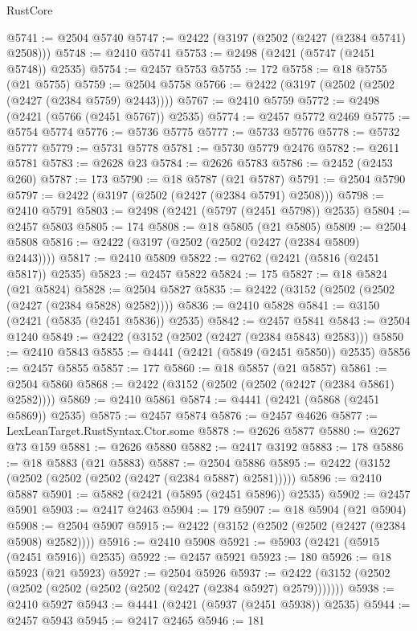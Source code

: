 \begin{lexlean}{RustCore}
\begin{coremodule}
@5741 := @2504 @5740
@5747 := @2422 (@3197 (@2502 (@2427 (@2384 @5741) @2508)))
@5748 := @2410 @5741
@5753 := @2498 (@2421 (@5747 (@2451 @5748)) @2535)
@5754 := @2457 @5753
@5755 := 172
@5758 := @18 @5755 (@21 @5755)
@5759 := @2504 @5758
@5766 := @2422 (@3197 (@2502 (@2502 (@2427 (@2384 @5759) @2443))))
@5767 := @2410 @5759
@5772 := @2498 (@2421 (@5766 (@2451 @5767)) @2535)
@5774 := @2457 @5772 @2469
@5775 := @5754 @5774
@5776 := @5736 @5775
@5777 := @5733 @5776
@5778 := @5732 @5777
@5779 := @5731 @5778
@5781 := @5730 @5779 @2476
@5782 := @2611 @5781
@5783 := @2628 @23
@5784 := @2626 @5783
@5786 := @2452 (@2453 @260)
@5787 := 173
@5790 := @18 @5787 (@21 @5787)
@5791 := @2504 @5790
@5797 := @2422 (@3197 (@2502 (@2427 (@2384 @5791) @2508)))
@5798 := @2410 @5791
@5803 := @2498 (@2421 (@5797 (@2451 @5798)) @2535)
@5804 := @2457 @5803
@5805 := 174
@5808 := @18 @5805 (@21 @5805)
@5809 := @2504 @5808
@5816 := @2422 (@3197 (@2502 (@2502 (@2427 (@2384 @5809) @2443))))
@5817 := @2410 @5809
@5822 := @2762 (@2421 (@5816 (@2451 @5817)) @2535)
@5823 := @2457 @5822
@5824 := 175
@5827 := @18 @5824 (@21 @5824)
@5828 := @2504 @5827
@5835 := @2422 (@3152 (@2502 (@2502 (@2427 (@2384 @5828) @2582))))
@5836 := @2410 @5828
@5841 := @3150 (@2421 (@5835 (@2451 @5836)) @2535)
@5842 := @2457 @5841
@5843 := @2504 @1240
@5849 := @2422 (@3152 (@2502 (@2427 (@2384 @5843) @2583)))
@5850 := @2410 @5843
@5855 := @4441 (@2421 (@5849 (@2451 @5850)) @2535)
@5856 := @2457 @5855
@5857 := 177
@5860 := @18 @5857 (@21 @5857)
@5861 := @2504 @5860
@5868 := @2422 (@3152 (@2502 (@2502 (@2427 (@2384 @5861) @2582))))
@5869 := @2410 @5861
@5874 := @4441 (@2421 (@5868 (@2451 @5869)) @2535)
@5875 := @2457 @5874
@5876 := @2457 @4626
@5877 := LexLeanTarget.RustSyntax.Ctor.some
@5878 := @2626 @5877
@5880 := @2627 @73 @159
@5881 := @2626 @5880
@5882 := @2417 @3192
@5883 := 178
@5886 := @18 @5883 (@21 @5883)
@5887 := @2504 @5886
@5895 := @2422 (@3152 (@2502 (@2502 (@2502 (@2427 (@2384 @5887) @2581)))))
@5896 := @2410 @5887
@5901 := @5882 (@2421 (@5895 (@2451 @5896)) @2535)
@5902 := @2457 @5901
@5903 := @2417 @2463
@5904 := 179
@5907 := @18 @5904 (@21 @5904)
@5908 := @2504 @5907
@5915 := @2422 (@3152 (@2502 (@2502 (@2427 (@2384 @5908) @2582))))
@5916 := @2410 @5908
@5921 := @5903 (@2421 (@5915 (@2451 @5916)) @2535)
@5922 := @2457 @5921
@5923 := 180
@5926 := @18 @5923 (@21 @5923)
@5927 := @2504 @5926
@5937 := @2422 (@3152 (@2502 (@2502 (@2502 (@2502 (@2502 (@2427 (@2384 @5927) @2579)))))))
@5938 := @2410 @5927
@5943 := @4441 (@2421 (@5937 (@2451 @5938)) @2535)
@5944 := @2457 @5943
@5945 := @2417 @2465
@5946 := 181

\end{coremodule}
\end{lexlean}
